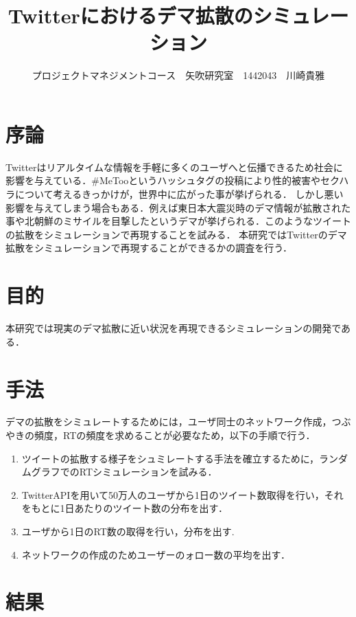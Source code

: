 \documentclass[uplatex,twocolumn,dvipdfmx]{jsarticle}
\title{\vspace{-5mm}\fontsize{14pt}{0pt}\selectfont Twitterにおけるデマ拡散のシミュレーション}
\author{\normalsize プロジェクトマネジメントコース　矢吹研究室　1442043　川崎貴雅}
\date{}
\begin{document}
\fontsize{10.5pt}{\baselineskip}\selectfont
\maketitle



\section{序論}\label{序論}

Twitterはリアルタイムな情報を手軽に多くのユーザへと伝播できるため社会に影響を与えている．\#MeTooというハッシュタグの投稿により性的被害やセクハラについて考えるきっかけが，世界中に広がった事が挙げられる．
しかし悪い影響を与えてしまう場合もある．例えば東日本大震災時のデマ情報が拡散された事や北朝鮮のミサイルを目撃したというデマが挙げられる．このようなツイートの拡散をシミュレーションで再現することを試みる．
本研究ではTwitterのデマ拡散をシミュレーションで再現することができるかの調査を行う．

\section{目的}

本研究では現実のデマ拡散に近い状況を再現できるシミュレーションの開発である．

\section{手法}

デマの拡散をシミュレートするためには，ユーザ同士のネットワーク作成，つぶやきの頻度，RTの頻度を求めることが必要なため，以下の手順で行う．
\begin{enumerate}
\item ツイートの拡散する様子をシュミレートする手法を確立するために，ランダムグラフでのRTシミュレーションを試みる\cite{netto}．
\item TwitterAPIを用いて50万人のユーザから1日のツイート数取得を行い，それをもとに1日あたりのツイート数の分布を出す．
\item ユーザから1日のRT数の取得を行い，分布を出す.
\item ネットワークの作成のためユーザーのォロー数の平均を出す．
\end{enumerate}

\section{結果}
\end{document}
